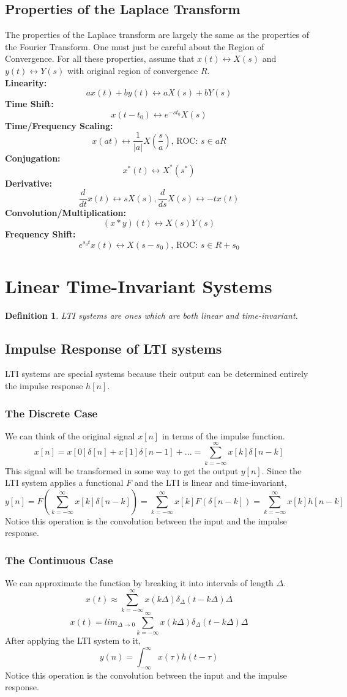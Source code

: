 \documentclass{article}
\newtheorem{definition}{Definition}
\begin{document}
\subsection{Properties of the Laplace Transform}
The properties of the Laplace transform are largely the same as the properties of the Fourier Transform. One must just be careful about the Region of Convergence.
For all these properties, assume that $x(t) \leftrightarrow X(s)$ and $y(t) \leftrightarrow Y(s)$ with original region of convergence $R$.\\
\textbf{Linearity: } 
$$ax(t) + by(t) \leftrightarrow aX(s) + bY(s)$$
\textbf{Time Shift: }
$$x(t-t_0) \leftrightarrow e^{-s t_0}X(s)$$
\textbf{Time/Frequency Scaling: }
$$x(at) \leftrightarrow \frac{1}{|a|}X(\frac{s}{a})\text{, ROC: }s\in aR$$
\textbf{Conjugation: } 
$$x^*(t) \leftrightarrow X^*(s^*)$$
\textbf{Derivative: } 
$$\frac{d}{dt}x(t) \leftrightarrow s X(s), \frac{d}{ds}X(s) \leftrightarrow -t x(t)$$
\textbf{Convolution/Multiplication: } 
$$(x*y)(t) \leftrightarrow X(s)Y(s)$$
\textbf{Frequency Shift: } 
$$e^{s_0 t}x(t) \leftrightarrow X(s - s_0)\text{, ROC: }s\in R+s_0$$
\section{Linear Time-Invariant Systems}
\begin{definition}
    LTI systems are ones which are both linear and time-invariant.
\end{definition}
\subsection{Impulse Response of LTI systems}
LTI systems are special systems because their output can be determined entirely the impulse response $h[n]$.
\subsubsection{The Discrete Case}
We can think of the original signal $x[n]$ in terms of the impulse function.
$$x[n] = x[0]\delta[n]+x[1]\delta[n-1]+... = \sum_{k=-\infty}^{\infty}{x[k]\delta[n-k]}$$
This signal will be transformed in some way to get the output $y[n]$.
Since the LTI system applies a functional $F$ and the LTI is linear and time-invariant,
$$y[n] = F(\sum_{k=-\infty}^{\infty}{x[k]\delta[n-k]}) = \sum_{k=-\infty}^{\infty}{x[k]F(\delta[n-k])} = \sum_{k=-\infty}^{\infty}{x[k]h[n-k]}$$
Notice this operation is the convolution between the input and the impulse response.
\subsubsection{The Continuous Case}
We can approximate the function by breaking it into intervals of length $\Delta$.
$$x(t) \approx \sum_{k=-\infty}^{\infty}{x(k\Delta)\delta_{\Delta}(t-k\Delta)\Delta}$$
$$x(t) = lim_{\Delta \rightarrow 0}\sum_{k=-\infty}^{\infty}{x(k\Delta)\delta_{\Delta}(t-k\Delta)\Delta}$$
After applying the LTI system to it,
$$y(n) = \int_{-\infty}^{\infty}{x(\tau)h(t-\tau)}$$
Notice this operation is the convolution between the input and the impulse response.
\end{document}
